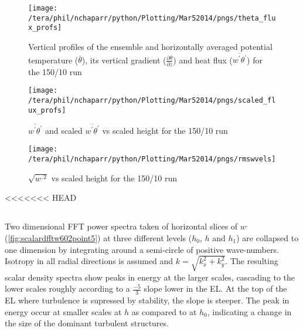 \begin{figure}[htbp]
    \centering
    \texttt{[image: /tera/phil/nchaparr/python/Plotting/Mar52014/pngs/theta\_flux\_profs]}
    \caption{Vertical profiles of the ensemble and horizontally averaged potential temperature ($\overline{\theta}$), its vertical gradient ($\frac{\partial \overline{\theta}}{\partial z}$)  
     and heat flux ($\overline{w^{'}\theta^{'}}$) for the 150/10 run}
    \label{fig:tempgradfluxprofs15010}   %
\end{figure}

\begin{figure}[htbp]
    \centering
    \texttt{[image: /tera/phil/nchaparr/python/Plotting/Mar52014/pngs/scaled\_flux\_profs]}
    \caption{$\overline{w^{'}\theta^{'}}$ and scaled $\overline{w^{'}\theta^{'}}$  vs scaled height for the 150/10 run}
    \label{fig:scaledfluxprofs15010}   %
\end{figure}

\begin{figure}[htbp]
    \centering
    \texttt{[image: /tera/phil/nchaparr/python/Plotting/Mar52014/pngs/rmswvels]}
    \caption{$\sqrt{w^{,2}}$ vs scaled height for the 150/10 run}
    \label{fig:rmswvelprofs15010}   %
\end{figure}

\clearpage
<<<<<<< HEAD
\subsection{}
\FloatBarrier

Two dimensional \acs{FFT} power spectra taken of horizontal slices of $w^{,}$ (\ref{fig:scalardfftw602point5}) at three
different levels ($h_{0}$, $h$ and $h_{1}$) are collapsed to one dimension by integrating around a semi-circle of positive wave-numbers.
Isotropy in all radial directions is assumed and $k = \sqrt{k_{x}^{2} + k_{y}^{2}}$.  The resulting scalar density spectra show peaks in 
energy at the larger scales, cascading to the lower scales roughly according to a $\frac{-5}{3}$ slope lower in the \acs{EL}.  At
the top of the \acs{EL} where turbulence is supressed by stability, the slope is steeper.  The peak in energy occur at smaller scales
at $h$ as compared to at $h_{0}$, indicating a change in the size of the dominant turbulent structures.\\

